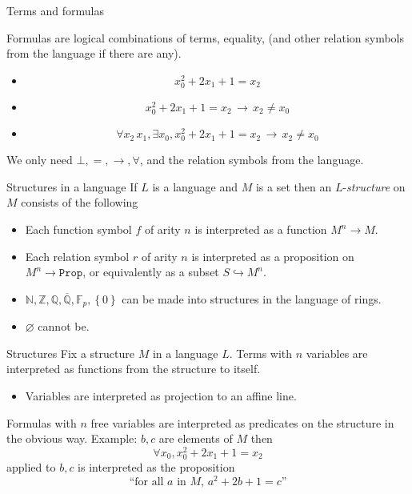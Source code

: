 \documentclass[10pt]{beamer}
\newcommand{\set}[1]{\left\{#1\right\}}
\newcommand{\N}{\mathbb{N}}
\newcommand{\Z}{\mathbb{Z}}
\newcommand{\Q}{\mathbb{Q}}
\newcommand{\F}{\mathbb{F}}
\newcommand{\hookr}{\hookrightarrow}
\renewcommand{\bar}[1]{\overline{#1}}
\newcommand{\<}{\langle}
\renewcommand{\>}{\rangle}
\begin{document}
\begin{frame}[fragile]{Terms and formulas}

  Formulas are logical combinations of terms, equality,
  (and other relation symbols from the language if there are any).
  \begin{itemize}[<+->]
    \item[]
          \[ x_{0}^{2} + 2 x_{1} + 1 = x_{2} \]
    \item[] \[ x_{0}^{2} + 2 x_{1} + 1 = x_{2} \, \to \, x_{2} \ne x_{0}\]
    \item[] \[ \forall x_{2} \, x_{1}, \exists x_{0}, x_{0}^{2} + 2 x_{1} + 1 = x_{2} \, \to \, x_{2} \ne x_{0}\]
  \end{itemize}
  We only need $\bot, =, \to, \forall$, and the relation symbols from the language.

\end{frame}

\begin{frame}[fragile]{Structures in a language}
  If $L$ is a language and $M$ is a set
  then an $L$-\textit{structure} on $M$ consists of the following
    \begin{itemize}[<+->]
      \item Each function symbol $f$ of arity $n$ is interpreted as a
            function $M^{n} \to M$.
      \item Each relation symbol $r$ of arity $n$
            is interpreted as a proposition on $M^{n} \to \texttt{Prop}$,
            or equivalently as a subset $S \hookr M^{n}$.
      \vspace{1 em}

      \item[] $\N, \Z, \Q, \bar{\Q}, \F_{p}, \set{0}$ can be made into
            structures in the language of rings.
      \item[] $\varnothing$ cannot be.
    \end{itemize}
  \end{frame}

\begin{frame}[fragile]{Structures}
  Fix a structure $M$ in a language $L$.
  Terms with $n$ variables are interpreted as functions from the structure to itself.
  \begin{itemize}
    \item <2-> Variables are interpreted as projection to an affine line.
  \end{itemize}
  \pause \pause
  Formulas with $n$ free variables are interpreted as predicates
  on the structure in the obvious way. \pause
  Example: $b , c $ are elements of $M$ then
  \[\forall x_{0}, x_{0}^{2} + 2 x_{1} + 1 = x_{2}\] applied to $b, c$ is interpreted as
  the proposition \[\text{``for all $a$ in $M$, } a^{2} + 2 b + 1 = c\text{''}\]

\end{frame}
\end{document}
